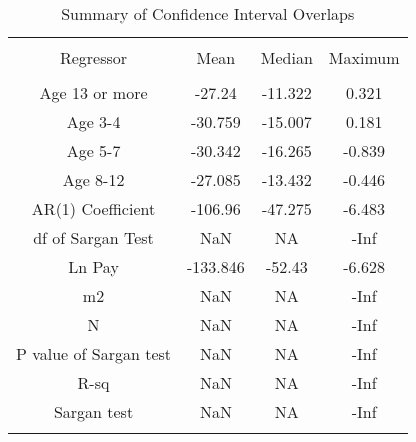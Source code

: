 
\begin{table}[!htbp] \centering 
  \caption{Summary of Confidence Interval Overlaps} 
  \label{tab:jkm} 
\begin{tabular}{@{\extracolsep{5pt}} cccc} 
\\[-1.8ex]\hline 
\hline \\[-1.8ex] 
Regressor & Mean & Median & Maximum \\ 
\hline \\[-1.8ex] 
Age 13 or more & -27.24 & -11.322 & 0.321 \\ 
Age 3-4 & -30.759 & -15.007 & 0.181 \\ 
Age 5-7 & -30.342 & -16.265 & -0.839 \\ 
Age 8-12 & -27.085 & -13.432 & -0.446 \\ 
AR(1) Coefficient & -106.96 & -47.275 & -6.483 \\ 
df of Sargan Test & NaN & NA & -Inf \\ 
Ln Pay & -133.846 & -52.43 & -6.628 \\ 
m2 & NaN & NA & -Inf \\ 
N & NaN & NA & -Inf \\ 
P value of Sargan test & NaN & NA & -Inf \\ 
R-sq & NaN & NA & -Inf \\ 
Sargan test & NaN & NA & -Inf \\ 
\hline \\[-1.8ex] 
\end{tabular} 
\end{table} 
